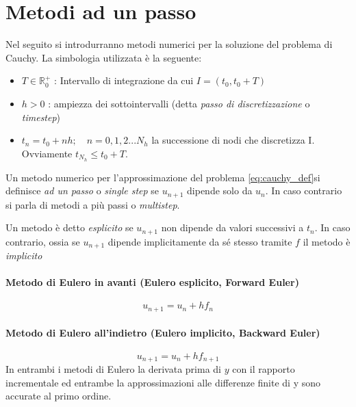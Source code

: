 \section{Metodi ad un passo} 
Nel seguito si introdurranno metodi numerici per la soluzione del problema di Cauchy. La simbologia utilizzata è la seguente: \begin{itemize}
    \item  $T \in \mathbb{R}_0^+ $ : Intervallo di integrazione da cui $ I = (t_0, t_0+T)$
    \item $h>0$ : ampiezza dei sottointervalli (detta \emph{passo di discretizzazione} o \emph{timestep})  
    \item $  t_n = t_0+nh; \quad n = 0,1,2... N_h$ la successione di nodi che discretizza I. Ovviamente $t_{N_h} \leq t_0+T$. \newline
\end{itemize}{}
\begin{definition}  \label{def:single_step} 
Un metodo numerico per l'approssimazione del problema \ref{eq:cauchy_def}si definisce \emph{ad un passo} o \emph{single step} se $u_{n+1}$ dipende solo da $u_n$. In caso contrario si parla di metodi a più passi o \emph{multistep}.\end{definition}
\begin{definition} 
Un metodo è detto \emph{esplicito} se $u_{n+1}$ non dipende da valori successivi a $t_n$. In caso contrario, ossia se $u_{n+1}$ dipende implicitamente da sé stesso tramite $f$ il metodo è \emph{implicito} \end{definition}
\paragraph{Metodo di Eulero in avanti (Eulero esplicito, Forward Euler)}
\begin{equation} \label{eq:Eul_Forw}
    u_{n+1} = u_n + h f_n
\end{equation}
\paragraph{Metodo di Eulero all'indietro (Eulero implicito, Backward Euler)}
\begin{equation}
    u_{n+1} = u_n + h f_{n+1}
\end{equation}
In entrambi i metodi di Eulero la derivata prima di $y$ con il rapporto incrementale ed entrambe la approssimazioni alle differenze finite di y sono accurate al primo ordine.
